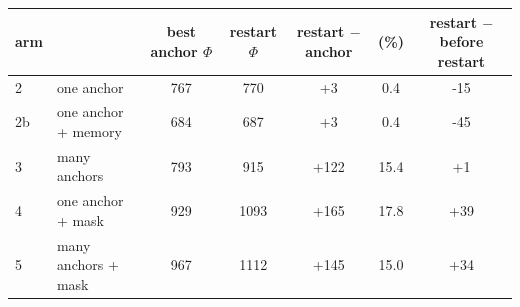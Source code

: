\begin{tabular}{llccccc}\toprule
 arm & & best anchor $\Phi$ & restart $\Phi$ & restart $-$ anchor & (\%) & restart $-$ before restart \\ \midrule
2 & one anchor & 767 & 770 & +3 & 0.4 & -15 \\
2b & one anchor + memory & 684 & 687 & +3 & 0.4 & -45 \\
3 & many anchors & 793 & 915 & +122 & 15.4 & +1 \\
4 & one anchor + mask & 929 & 1093 & +165 & 17.8 & +39 \\
5 & many anchors + mask & 967 & 1112 & +145 & 15.0 & +34 \\
\bottomrule\end{tabular}
